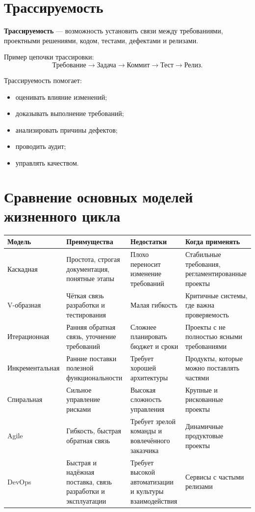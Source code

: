\documentclass[12pt,a4paper]{article}
\begin{document}
\section{Трассируемость}

\textbf{Трассируемость} --- возможность установить связи между требованиями, проектными решениями, кодом, тестами, дефектами и релизами.

Пример цепочки трассировки:
\[
\text{Требование}
\rightarrow
\text{Задача}
\rightarrow
\text{Коммит}
\rightarrow
\text{Тест}
\rightarrow
\text{Релиз}.
\]

Трассируемость помогает:
\begin{itemize}
    \item оценивать влияние изменений;
    \item доказывать выполнение требований;
    \item анализировать причины дефектов;
    \item проводить аудит;
    \item управлять качеством.
\end{itemize}

\section{Сравнение основных моделей жизненного цикла}

\begin{longtable}{|p{3.2cm}|p{4.2cm}|p{4.2cm}|p{3.2cm}|}
\hline
\textbf{Модель} & \textbf{Преимущества} & \textbf{Недостатки} & \textbf{Когда применять} \\
\hline
Каскадная &
Простота, строгая документация, понятные этапы &
Плохо переносит изменение требований &
Стабильные требования, регламентированные проекты \\
\hline
V-образная &
Чёткая связь разработки и тестирования &
Малая гибкость &
Критичные системы, где важна проверяемость \\
\hline
Итерационная &
Ранняя обратная связь, уточнение требований &
Сложнее планировать бюджет и сроки &
Проекты с не полностью ясными требованиями \\
\hline
Инкрементальная &
Ранние поставки полезной функциональности &
Требует хорошей архитектуры &
Продукты, которые можно поставлять частями \\
\hline
Спиральная &
Сильное управление рисками &
Высокая сложность управления &
Крупные и рискованные проекты \\
\hline
Agile &
Гибкость, быстрая обратная связь &
Требует зрелой команды и вовлечённого заказчика &
Динамичные продуктовые проекты \\
\hline
DevOps &
Быстрая и надёжная поставка, связь разработки и эксплуатации &
Требует высокой автоматизации и культуры взаимодействия &
Сервисы с частыми релизами \\
\hline
\end{longtable}
\end{document}
